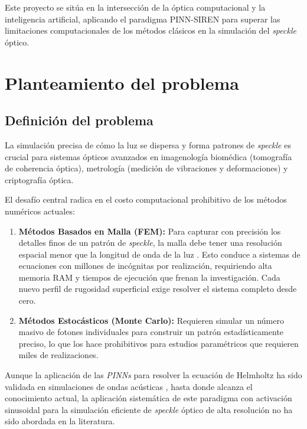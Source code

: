 Este proyecto se sitúa en la intersección de la óptica computacional y la
inteligencia artificial, aplicando el paradigma PINN-SIREN para superar las
limitaciones computacionales de los métodos clásicos en la simulación del
\textit{speckle} óptico.

\section{Planteamiento del problema}

\subsection{Definición del problema}

La simulación precisa de cómo la luz se dispersa y forma patrones de
\textit{speckle} es crucial para sistemas ópticos avanzados en imagenología
biomédica (tomografía de coherencia óptica), metrología (medición de
vibraciones y deformaciones) y criptografía óptica.

El desafío central radica en el costo computacional prohibitivo de los métodos
numéricos actuales:

\begin{enumerate}
    \item \textbf{Métodos Basados en Malla (FEM):} Para capturar con precisión
    los detalles finos de un patrón de \textit{speckle}, la malla debe tener
    una resolución espacial menor que la longitud de onda de la luz
    \parencite{jin2014finite}. Esto conduce a sistemas de ecuaciones con millones
    de incógnitas por realización, requiriendo alta memoria RAM y tiempos de
    ejecución que frenan la investigación. Cada nuevo perfil de rugosidad
    superficial exige resolver el sistema completo desde cero.

    \item \textbf{Métodos Estocásticos (Monte Carlo):} Requieren simular un
    número masivo de fotones individuales para construir un patrón estadísticamente
    preciso, lo que los hace prohibitivos para estudios paramétricos que requieren
    miles de realizaciones.
\end{enumerate}

Aunque la aplicación de las \textit{PINNs} para resolver la ecuación de
Helmholtz ha sido validada en simulaciones de ondas acústicas
\parencite{schoder2024helmholtz}, hasta donde alcanza el conocimiento actual, la
aplicación sistemática de este paradigma con activación sinusoidal para la
simulación eficiente de \textit{speckle} óptico de alta resolución no ha sido
abordada en la literatura.

